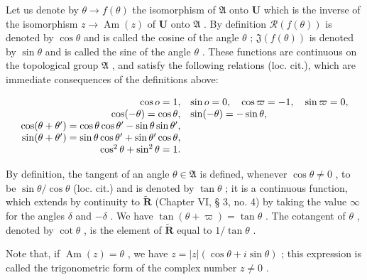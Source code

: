 Let us denote by \(\theta \to f(\theta)\) the isomorphism of \(\mathfrak{A}\) onto \(\mathbf{U}\) which is the inverse of the isomorphism \(z \to \operatorname{Am}(z)\) of \(\mathbf{U}\) onto \(\mathfrak{A}\) . By definition \(\mathcal{R}(f(\theta))\) is denoted by \(\cos \theta\) and is called the cosine of the angle \(\theta\) ; \(\mathfrak{J}(f(\theta))\) is denoted by \(\sin \theta\) and is called the sine of the angle \(\theta\) . These functions are continuous on the topological group \(\mathfrak{A}\) , and satisfy the following relations (loc. cit.), which are immediate consequences of the definitions above:

\[
\begin{array}{r l} \cos o = 1, & \sin o = 0, \quad \cos \varpi = - 1, \quad \sin \varpi = 0, \\ \cos (- \theta) = \cos \theta , & \sin (- \theta) = - \sin \theta , \\ \cos (\theta + \theta^ {\prime}) = \cos \theta \cos \theta^ {\prime} - \sin \theta \sin \theta^ {\prime}, \\ \sin (\theta + \theta^ {\prime}) = \sin \theta \cos \theta^ {\prime} + \sin \theta^ {\prime} \cos \theta , \\ \cos^ {2} \theta + \sin^ {2} \theta = 1. \end{array}
\]

By definition, the tangent of an angle \(\theta \in \mathfrak{A}\) is defined, whenever \(\cos \theta \neq 0\) , to be \(\sin \theta / \cos \theta\) (loc. cit.) and is denoted by \(\tan \theta\) ; it is a continuous function, which extends by continuity to \(\tilde{\mathbf{R}}\) (Chapter VI, § 3, no. 4) by taking the value \(\infty\) for the angles \(\delta\) and \(-\delta\) . We have \(\tan (\theta + \varpi) = \tan \theta\) . The cotangent of \(\theta\) , denoted by \(\cot \theta\) , is the element of \(\tilde{\mathbf{R}}\) equal to \(1 / \tan \theta\) .

Note that, if \(\operatorname{Am}(z) = \theta\) , we have \(z = |z| (\cos \theta + i \sin \theta)\) ; this expression is called the trigonometric form of the complex number \(z \neq 0\) .


